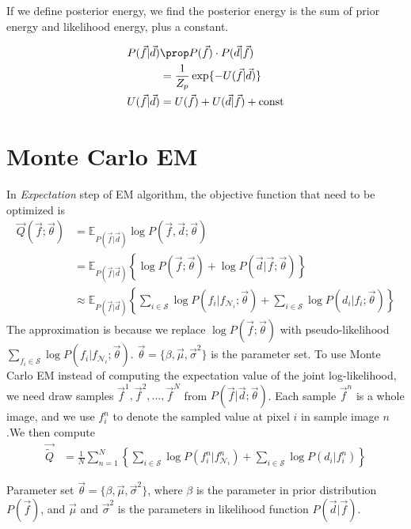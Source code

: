 \documentclass[12pt]{article}
\begin{document}
If we define posterior energy, we find the posterior energy is the sum of prior energy and likelihood energy, plus a constant.

\begin{align*}
  P(\vec f | \vec d) &\prop P(\vec f) \cdot P(\vec d | \vec f) \\
  &= \frac{1}{Z_p} \exp \{ -U(\vec f | \vec d)\} \\
  U(\vec f | \vec d) &= U(\vec f) + U(\vec d | \vec f) + \mathrm{const}
\end{align*}

\section{Monte Carlo EM}

In \emph{Expectation} step of EM algorithm, the objective function that need to be optimized is
\begin{align*}
  \vec Q (\vec f; \vec \theta)  &=\mathbb{E}_{P(\vec f | \vec d)} \log P(\vec f, \vec d; \vec \theta)\\
  &= \mathbb{E}_{P(\vec f | \vec d)} \left \{ \log P(\vec f; \vec \theta) + \log P(\vec d | \vec f; \vec \theta )\right \} \\
  &\approx \mathbb{E}_{P(\vec f | \vec d)} \left \{ \sum_{i \in \mathcal{S}} \log P(f_i | f_{\mathcal{N}_i}; \vec \theta) + \sum_{i \in \mathcal{S}} \log P(d_i | f_i; \vec \theta) \right \}
\end{align*}
The approximation is because we replace  $\log P(\vec f; \vec \theta)$ with pseudo-likelihood $\sum_{f_i \in \mathcal{S}} \log P(f_i | f_{\mathcal{N}_i}; \vec \theta)$. $\vec \theta = \{ \beta, \vec \mu, \vec \sigma^2 \}$ is the parameter set.
To use Monte Carlo EM instead of computing the expectation value of the joint log-likelihood, we need draw samples $\vec f^1, \vec f^2, \dots, \vec f^N$ from $P(\vec f | \vec d; \vec \theta)$. Each sample $\vec f^n$ is a whole image, and we use $f_i^n$ to denote the sampled value at pixel $i$ in sample image $n$.We then compute
\begin{align*}
  \vec {\widetilde Q} &= \frac{1}{N}\sum_{n=1}^N \left \{ \sum_{i \in \mathcal{S}} \log P(f_i^n | f^n_{\mathcal{N}_i}) + \sum_{i \in \mathcal{S}} \log P(d_i | f_i^n) \right \}
\end{align*}

Parameter set $\vec \theta = \{\beta, \vec \mu, \vec \sigma^2\}$, where $\beta$ is the parameter in prior distribution $P(\vec f)$, and $\vec \mu$ and $\vec \sigma^2$ is the parameters in likelihood function $P(\vec d| \vec f)$. 
\end{document}
